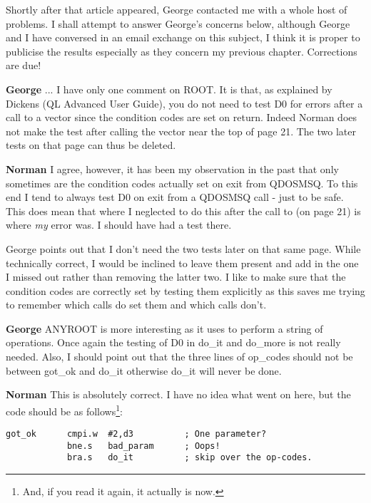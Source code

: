 Shortly after that article appeared, George contacted me with a
    whole host of problems. I shall attempt to answer George's concerns below, although George
    and I have conversed in an email exchange on this subject, I think it is
    proper to publicise the results especially as they concern my previous
    chapter. Corrections are due!

{\bf George} 
... I have only one comment on
    ROOT. It is that, as explained by Dickens (QL Advanced User Guide), you do
    not need to test D0 for errors after a call to a vector since the
    condition codes are set on return. Indeed Norman does not make the test
    after calling the vector  near the top of page 21. The two later
    tests on that page can thus be deleted.



{\bf Norman} 
I agree, however, it has been my
    observation in the past that only sometimes are the condition codes
    actually set on exit from QDOSMSQ. To this end I tend to always test D0 on
    exit from a QDOSMSQ call -{} just to be safe. This does mean that where I
    neglected to do this after the call to  (on page 21) is where \emph{my} error was. I should have had a test there.


George points out that I don't need the two tests later on that same
    page. While technically correct, I would be inclined to leave them present
    and add in the one I missed out rather than removing the latter two. I
    like to make sure that the condition codes are correctly set by testing
    them explicitly as this saves me trying to remember which calls do set
    them and which calls don't.

{\bf George} 
ANYROOT is more interesting as
    it uses  to perform a string of operations. Once again the testing
    of D0 in do\_it and do\_more is not really needed. Also, I should point out
    that the three lines of op\_codes should not be between got\_ok and do\_it
    otherwise do\_it will never be done.



{\bf Norman} 
This is absolutely correct. I
    have no idea what went on here, but the code should be as follows\footnote{And, if you read it again, it actually is now.}:



\begin{lstlisting}[firstnumber=53,caption={Corrections to ANYROOT Code in Previous chapter}]
got_ok      cmpi.w  #2,d3          ; One parameter?
            bne.s   bad_param      ; Oops!
            bra.s   do_it          ; skip over the op-codes.
\end{lstlisting}

